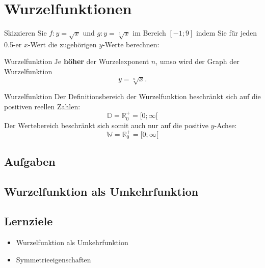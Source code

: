 \section{Wurzelfunktionen}






Skizzieren Sie $f: y = \sqrt{x}$ und $g: y=\sqrt[5]{x}$ im Bereich $[-1; 9]$ indem Sie für jeden 0.5-er $x$-Wert die zugehörigen $y$-Werte berechnen:


\begin{bemerkung}{Wurzelfunktion}{}
 Je \textbf{höher} der Wurzelexponent $n$, umso
  wird der Graph der Wurzelfunktion $$y=\sqrt[n]{x}.$$ 
\end{bemerkung}


\begin{definition}{Wurzelfunktion}{}
  Der Definitionsbereich der Wurzelfunktion beschränkt sich auf die
  positiven reellen Zahlen:
  $$\mathbb{D} = \mathbb{R}_0^{+} = [0;\infty[$$
      Der Wertebereich beschränkt sich somit auch nur auf die positive $y$-Achse:
  $$\mathbb{W} = \mathbb{R}_0^{+} = [0;\infty[$$
      
\end{definition}


\subsection*{Aufgaben}





\newpage

\subsection{Wurzelfunktion als
  Umkehrfunktion}

\subsection*{Lernziele}

\begin{itemize}
\item Wurzelfunktion als Umkehrfunktion
\item Symmetrieeigenschaften
\end{itemize}

